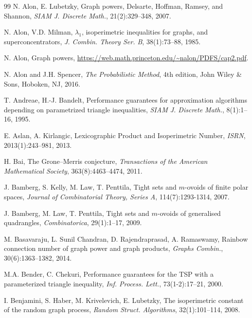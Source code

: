 \documentclass[a4paper,11pt]{article}
\theoremstyle{definition}
\newcommand{\marrow}{\marginpar[\hfill$\longrightarrow$]{$\longleftarrow$}}
\newcommand{\niceremarkcolor}[4]{\textcolor{#4}{\textsc{#1 #2:} \marrow\textsf{#3}}}
\newcommand{\jim}[2][says]{\niceremarkcolor{Jim}{#1}{#2}{Green}}
\begin{document}
\begin{thebibliography}{99}
 N. Alon, E. Lubetzky, Graph powers, Delsarte, Hoffman, Ramsey, and Shannon, \emph{SIAM J. Discrete Math.}, 21(2):329–348, 2007.

 N. Alon, V.D. Milman, $\lambda_1$, isoperimetric inequalities for graphs, and superconcentrators,
\emph{J. Combin. Theory Ser. B}, 38(1):73--88, 1985.


 N. Alon, Graph powers, \url{https://web.math.princeton.edu/~nalon/PDFS/cap2.pdf}.

 N. Alon and J.H. Spencer,
\emph{The Probabilistic Method},
4th edition, John Wiley \& Sons, Hoboken, NJ, 2016.

 T. Andreae, H.-J. Bandelt, Performance guarantees for approximation algorithms depending on parametrized triangle inequalities, \emph{SIAM J. Discrete Math.}, 8(1):1--16, 1995.


 E. Aslan, A. Kirlangic, Lexicographic Product and Isoperimetric Number, \textit{ISRN}, 2013(1):243--981, 2013.

H. Bai, The Grone–Merris conjecture, \emph{Transactions of the American Mathematical Society}, 363(8):4463--4474, 2011.

 J. Bamberg, S. Kelly, M. Law, T. Penttila, Tight sets and $m$-ovoids of finite polar spaces, \emph{Journal of Combinatorial Theory, Series A}, 114(7):1293-1314, 2007.

 J. Bamberg, M. Law, T. Penttila, Tight sets and $m$-ovoids of generalised quadrangles, \emph{Combinatorica}, 29(1):1--17, 2009.

 M. Basavaraju, L. Sunil Chandran, D. Rajendraprasad, A. Ramaswamy, Rainbow connection number of graph power and graph products, \emph{Graphs Combin.}, 30(6):1363--1382, 2014.


 M.A. Bender, C. Chekuri, Performance guarantees for the TSP with a parameterized triangle inequality, \emph{Inf. Process. Lett.}, 73(1-2):17--21, 2000.

I. Benjamini, S. Haber, M. Krivelevich, E. Lubetzky,
The isoperimetric constant of the random graph process,
\emph{Random Struct. Algorithms}, 32(1):101--114, 2008.



\end{thebibliography}
\end{document}
